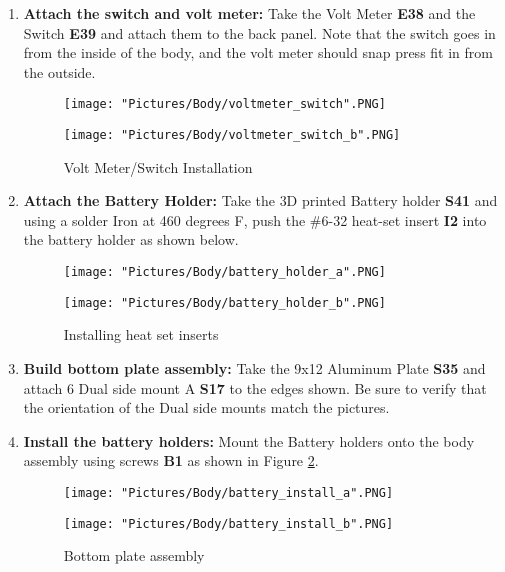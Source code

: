\documentclass[12pt]{article}
\begin{document}
\begin{enumerate}
\item \textbf{Attach the switch and volt meter:} Take the Volt Meter \textbf{E38} and the Switch \textbf{E39} and attach them to the back panel. Note that the switch goes in from the inside of the body, and the volt meter should snap press fit in from the outside.

\begin{figure}[H]
  \centering
  \begin{minipage}[b]{0.45\textwidth}
    \texttt{[image: "Pictures/Body/voltmeter\_switch".PNG]}
  \end{minipage}
  \hfill
  \begin{minipage}[b]{0.45\textwidth}
    \texttt{[image: "Pictures/Body/voltmeter\_switch\_b".PNG]}
  \end{minipage}
  \caption{Volt Meter/Switch Installation}
  \label{bottom}
\end{figure}


\item \textbf{Attach the Battery Holder:} Take the 3D printed Battery holder \textbf{S41} and using a solder Iron at 460 degrees F, push the \#6-32 heat-set insert \textbf{I2} into the battery holder as shown below.

\begin{figure}[H]
  \centering
  \begin{minipage}[b]{0.45\textwidth}
    \texttt{[image: "Pictures/Body/battery\_holder\_a".PNG]}
  \end{minipage}
  \hfill
  \begin{minipage}[b]{0.45\textwidth}
    \texttt{[image: "Pictures/Body/battery\_holder\_b".PNG]}
  \end{minipage}
  \caption{Installing heat set inserts}
\end{figure}

\item \textbf{Build bottom plate assembly:} Take the 9x12 Aluminum Plate \textbf{S35} and attach 6 Dual side mount A \textbf{S17} to the edges shown. Be sure to verify that the orientation of the Dual side mounts match the pictures.

\item \textbf{Install the battery holders:} Mount the Battery holders onto the body assembly using screws \textbf{B1} as shown in Figure \ref{bottom}.

\begin{figure}[H]
  \centering
  \begin{minipage}[b]{0.45\textwidth}
    \texttt{[image: "Pictures/Body/battery\_install\_a".PNG]}
  \end{minipage}
  \hfill
  \begin{minipage}[b]{0.45\textwidth}
    \texttt{[image: "Pictures/Body/battery\_install\_b".PNG]}
  \end{minipage}
  \caption{Bottom plate assembly}
  \label{bottom}
\end{figure}



\end{enumerate}
\end{document}
